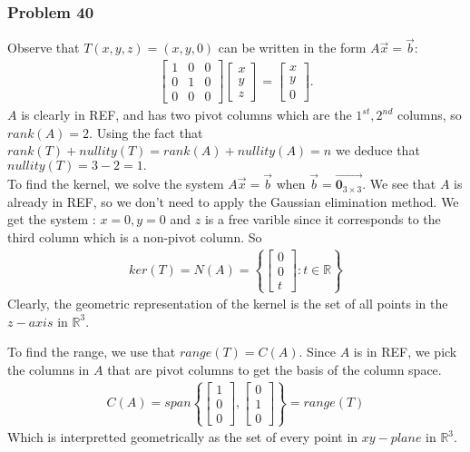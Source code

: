\documentclass[a4paper,12pt]{article}
\begin{document}
\subsubsection*{Problem 40}
Observe that $T(x,y,z)=(x,y,0)$ can be written in the form $A\vec{x}=\vec{b}:$
\begin{align*}
    \begin{bmatrix}
      1 & 0 & 0 \\
      0 & 1 & 0 \\
      0 & 0 & 0
    \end{bmatrix} \begin{bmatrix}
        x\\
        y\\
        z
    \end{bmatrix} = \begin{bmatrix}
        x\\
        y\\
        0
    \end{bmatrix}.
\end{align*}
$A$ is clearly in REF, and has two pivot columns which are the $1^{st}, 2^{nd}$ columns, so $rank(A)=2.$ Using the fact that $rank(T)+nullity(T)=rank(A)+nullity(A)=n$ we deduce that $nullity(T)=3-2=1.$
\\
To find the kernel, we solve the system $A\vec{x}=\vec{b}$ when $\vec{b}=\vec{\textbf{0}_{3\times 3}}$. We see that $A$ is already in REF, so we don't need to apply the Gaussian elimination method. We get the system : $x=0, y=0$ and $z$ is a free varible since it corresponds to the third column which is a non-pivot column. So \begin{align*}
    ker(T)=N(A)= 
     \left\{
        \begin{bmatrix}
            0\\
            0\\
            t
        \end{bmatrix}: t \in \mathbb{R}
    \right\}
\end{align*}
Clearly, the geometric representation of the kernel is the set of all points in the $z-axis$ in $\mathbb{R}^3.$

To find the range, we use that $range(T)=C(A).$ Since $A$ is in REF, we pick the columns in $A$ that are pivot columns to get the basis of the column space. 
\begin{align*}
    C(A)= span\left\{
        \begin{bmatrix}
            1\\
            0\\
            0
        \end{bmatrix},\begin{bmatrix}
            0\\
            1\\
            0
        \end{bmatrix}
    \right\} =range(T)
\end{align*}
Which is interpretted geometrically as the set of every point in $xy-plane$ in $\mathbb{R}^3.$
\setcounter{subsection}{2}
\end{document}
